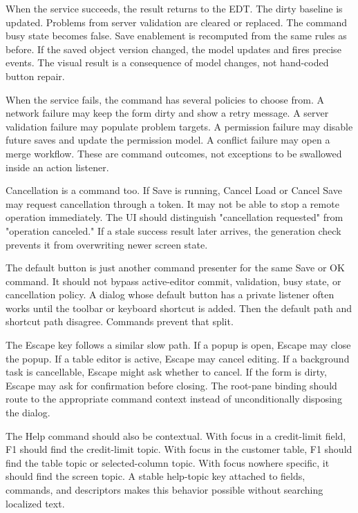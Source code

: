When the service succeeds, the result returns to the EDT. The dirty baseline is updated. Problems from server validation are cleared or replaced. The command busy state becomes false. Save enablement is recomputed from the same rules as before. If the saved object version changed, the model updates and fires precise events. The visual result is a consequence of model changes, not hand-coded button repair.

When the service fails, the command has several policies to choose from. A network failure may keep the form dirty and show a retry message. A server validation failure may populate problem targets. A permission failure may disable future saves and update the permission model. A conflict failure may open a merge workflow. These are command outcomes, not exceptions to be swallowed inside an action listener.

Cancellation is a command too. If Save is running, Cancel Load or Cancel Save may request cancellation through a token. It may not be able to stop a remote operation immediately. The UI should distinguish "cancellation requested" from "operation canceled." If a stale success result later arrives, the generation check prevents it from overwriting newer screen state.

The default button is just another command presenter for the same Save or OK command. It should not bypass active-editor commit, validation, busy state, or cancellation policy. A dialog whose default button has a private listener often works until the toolbar or keyboard shortcut is added. Then the default path and shortcut path disagree. Commands prevent that split.

The Escape key follows a similar slow path. If a popup is open, Escape may close the popup. If a table editor is active, Escape may cancel editing. If a background task is cancellable, Escape might ask whether to cancel. If the form is dirty, Escape may ask for confirmation before closing. The root-pane binding should route to the appropriate command context instead of unconditionally disposing the dialog.

The Help command should also be contextual. With focus in a credit-limit field, F1 should find the credit-limit topic. With focus in the customer table, F1 should find the table topic or selected-column topic. With focus nowhere specific, it should find the screen topic. A stable help-topic key attached to fields, commands, and descriptors makes this behavior possible without searching localized text.

